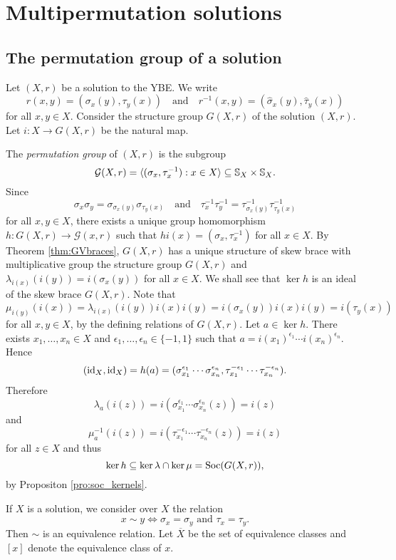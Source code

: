 \chapter{Multipermutation solutions}
\label{MP}

\section{The permutation group of a solution}

Let $(X,r)$ be a solution to the YBE. We write \[r(x,y)=(\sigma_x(y),\tau_y(x))\quad\text{and}\quad r^{-1}(x,y)=(\widehat{\sigma}_x(y),\widehat{\tau}_y(x))\] 
for all $x,y\in X$. Consider the structure group $G(X,r)$ of the solution $(X,r)$. Let $i\colon X\to G(X,r)$ be the natural map. 

The {\em permutation group} of $(X,r)$ is the subgroup
\[\mathcal{G}(X,r)=\langle (\sigma_x,\tau^{-1}_x) : x\in X\rangle\subseteq\mathbb{S}_X\times\mathbb{S}_X.\]
Since 
\[ \sigma_x\sigma_y=\sigma_{\sigma_x(y)}\sigma_{\tau_y(x)}\quad\text{and}\quad \tau^{-1}_x\tau^{-1}_y=\tau^{-1}_{\sigma_x(y)}\tau^{-1}_{\tau_y(x)} \]
for all $x,y\in X$, there exists a unique group homomorphism
$h\colon G(X,r)\to \mathcal{G}(x,r)$ such that $hi(x)=(\sigma_x,\tau^{-1}_x)$ for all $x\in X$.
By Theorem \ref{thm:GVbraces}, $G(X,r)$ has a unique structure of skew brace with multiplicative group the structure group $G(X,r)$ and $\lambda_{i(x)}(i(y))=i(\sigma_x(y))$ for all $x\in X$. We shall see that $\ker h$ is an ideal of the skew brace $G(X,r)$. Note that
\[\mu_{i(y)}(i(x))=\lambda_{i(x)}(i(y))i(x)i(y)=i(\sigma_x(y))i(x)i(y)=i(\tau_y(x))\]
for all $x,y\in X$, by the defining relations of $G(X,r)$.
Let $a\in \ker h$. There exists $x_1,\dots ,x_n\in X$ and $\epsilon_1,\dots ,\epsilon_n\in\{ -1,1\}$ such that
$a=i(x_1)^{\epsilon_1}\cdots i(x_n)^{\epsilon_n}$. Hence
\[(\operatorname{id}_X,\operatorname{id}_X)=h(a)=(\sigma_{x_1}^{\epsilon_1}\cdots\sigma_{x_n}^{\epsilon_n},\tau_{x_1}^{-\epsilon_1}\cdots \tau_{x_n}^{-\epsilon_n}).\]
Therefore
\[ \lambda_a(i(z))=i(\sigma_{x_1}^{\epsilon_1}\cdots\sigma_{x_n}^{\epsilon_n}(z))=i(z)\]
and
\[ \mu^{-1}_a(i(z))=i(\tau_{x_1}^{-\epsilon_1}\cdots \tau_{x_n}^{-\epsilon_n}(z))=i(z)\]
for all $z\in X$ and thus 
\[\ker h\subseteq \ker\lambda\cap\ker\mu=\operatorname{Soc}(G(X,r)),\]
by Propositon \ref{pro:soc_kernels}.


If $X$ is a solution, we 
consider over $X$ the relation
\[
x\sim y\Longleftrightarrow \sigma_x=\sigma_y\text{ and }\tau_x=\tau_y.
\]
Then $\sim$ is an equivalence relation. 
Let $\overline{X}$ be the set of equivalence classes 
and $[x]$ 
denote the equivalence class of $x$. 

